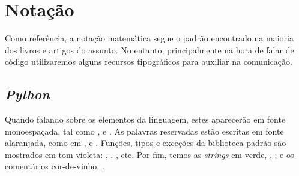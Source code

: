 \chapter{Notação}
   Como referência, a notação matemática segue o padrão encontrado na maioria dos livros e artigos do assunto. No entanto, principalmente na hora de falar de código utilizaremos alguns recursos tipográficos para auxiliar na comunicação. \par

   \section*{\textit{Python}}%
   Quando falando sobre os elementos da linguagem, estes aparecerão em fonte monoespaçada, tal como ,  e .
   As palavras reservadas estão escritas em fonte alaranjada, como em ,  e . Funções, tipos e exceções da biblioteca padrão são mostrados em tom violeta: , , , etc. Por fim, temos as \textit{strings} em verde, , ; e os comentários cor-de-vinho, .